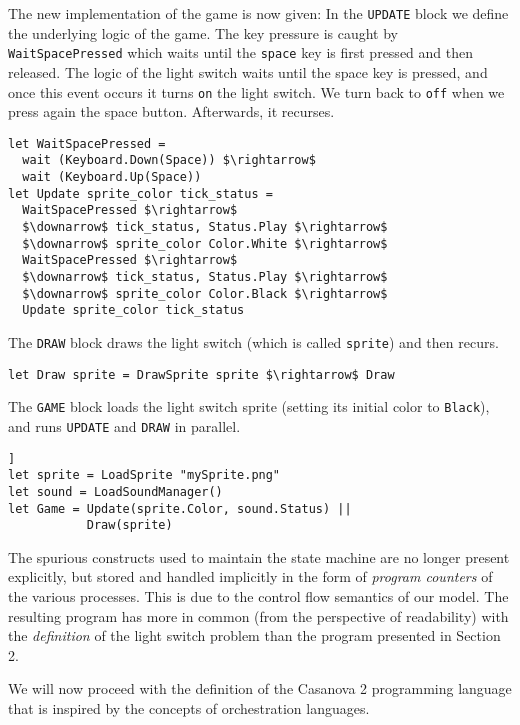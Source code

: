 The new implementation of the game is now given:
In the \texttt{UPDATE} block we define the underlying logic of the game. The key pressure is caught by \texttt{WaitSpacePressed} which waits until the \texttt{space} key is first pressed and then released. The logic of the light switch waits until the space key is pressed, and once this event occurs it turns \texttt{on} the light switch. We turn back to \texttt{off} when we press again the space button. Afterwards, it recurses.
\begin{lstlisting}[caption=LOGIC]
let WaitSpacePressed = 
  wait (Keyboard.Down(Space)) $\rightarrow$
  wait (Keyboard.Up(Space))
let Update sprite_color tick_status = 
  WaitSpacePressed $\rightarrow$
  $\downarrow$ tick_status, Status.Play $\rightarrow$
  $\downarrow$ sprite_color Color.White $\rightarrow$  
  WaitSpacePressed $\rightarrow$
  $\downarrow$ tick_status, Status.Play $\rightarrow$
  $\downarrow$ sprite_color Color.Black $\rightarrow$
  Update sprite_color tick_status
\end{lstlisting}
The \texttt{DRAW} block draws the light switch (which is called \texttt{sprite}) and then recurs.
\begin{lstlisting}[frame=single, caption=DRAW]
let Draw sprite = DrawSprite sprite $\rightarrow$ Draw
\end{lstlisting}
The \texttt{GAME} block loads the light switch sprite (setting its initial color to \texttt{Black}), and runs \texttt{UPDATE} and \texttt{DRAW} in parallel.
\begin{lstlisting}[frame=single, caption=LOOP]]
let sprite = LoadSprite "mySprite.png"
let sound = LoadSoundManager()
let Game = Update(sprite.Color, sound.Status) || 
           Draw(sprite)				
\end{lstlisting}
The spurious constructs used to maintain the state machine are no longer present explicitly, but stored and handled implicitly in the form of \textit{program counters} of the various processes. This is due to the control flow semantics of our model. The resulting program has more in common (from the perspective of readability) with the \textit{definition} of the light switch problem than the program presented in Section 2.


We will now proceed with the definition of the Casanova 2 programming language that is inspired by the concepts of orchestration languages. 